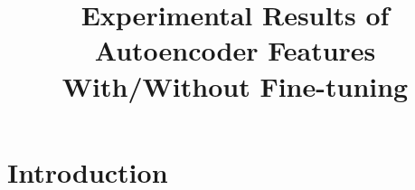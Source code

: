 \documentclass[10pt, conference, compsocconf]{IEEEtran}
\begin{document}
%
\title{Experimental Results of Autoencoder Features With/Without Fine-tuning}



\begin{comment}
\author{\IEEEauthorblockN{Authors Name/s per 1st Affiliation (Author)}
\IEEEauthorblockA{line 1 (of Affiliation): dept. name of organization\\
line 2: name of organization, acronyms acceptable\\
line 3: City, Country\\
line 4: Email: name@xyz.com}
\and
\IEEEauthorblockN{Authors Name/s per 2nd Affiliation (Author)}
\IEEEauthorblockA{line 1 (of Affiliation): dept. name of organization\\
line 2: name of organization, acronyms acceptable\\
line 3: City, Country\\
line 4: Email: name@xyz.com}
}
\end{comment}



\maketitle


\begin{abstract}


\end{abstract}

\begin{IEEEkeywords}


\end{IEEEkeywords}


%
\IEEEpeerreviewmaketitle



\section{Introduction}
\end{document}

